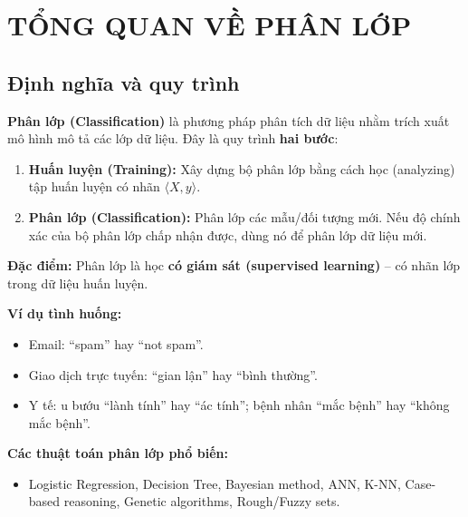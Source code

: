 \documentclass[10pt]{article}
\begin{document}
\onehalfspacing
\renewcommand{\arraystretch}{1.5}

\newcommand{\ChapterNum}{4}
\newcommand{\ChapterTitle}{PHÂN LỚP DỮ LIỆU (DATA CLASSIFICATION)}


\section{TỔNG QUAN VỀ PHÂN LỚP}

\subsection{Định nghĩa và quy trình}

\textbf{Phân lớp (Classification)} là phương pháp phân tích dữ liệu nhằm trích xuất mô hình mô tả các lớp dữ liệu. Đây là quy trình \textbf{hai bước}:
\begin{enumerate}
    \item \textbf{Huấn luyện (Training):} Xây dựng bộ phân lớp bằng cách học (analyzing) tập huấn luyện có nhãn $\langle X, y \rangle$.
    \item \textbf{Phân lớp (Classification):} Phân lớp các mẫu/đối tượng mới. Nếu độ chính xác của bộ phân lớp chấp nhận được, dùng nó để phân lớp dữ liệu mới.
\end{enumerate}

\textbf{Đặc điểm:} Phân lớp là học \textbf{có giám sát (supervised learning)} -- có nhãn lớp trong dữ liệu huấn luyện.

\textbf{Ví dụ tình huống:}
\begin{itemize}
    \item Email: ``spam'' hay ``not spam''.
    \item Giao dịch trực tuyến: ``gian lận'' hay ``bình thường''.
    \item Y tế: u bướu ``lành tính'' hay ``ác tính''; bệnh nhân ``mắc bệnh'' hay ``không mắc bệnh''.
\end{itemize}

\textbf{Các thuật toán phân lớp phổ biến:}
\begin{itemize}
    \item Logistic Regression, Decision Tree, Bayesian method, ANN, K-NN, Case-based reasoning, Genetic algorithms, Rough/Fuzzy sets.
\end{itemize}

\end{document}
